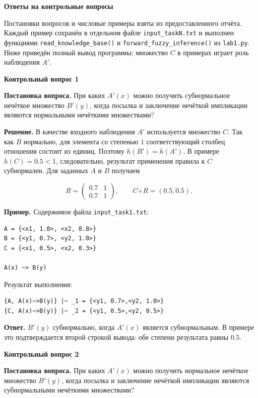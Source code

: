 \documentclass[14pt,a4paper]{extarticle}
\newcommand{\reportheading}[1]{\par\vspace{0.8\baselineskip}\noindent\textbf{#1}\par\nobreak\vspace{0.35\baselineskip}\nobreak}
\begin{document}
\clearpage
\reportheading{Ответы на контрольные вопросы}

Постановки вопросов и числовые примеры взяты из предоставленного отчёта. Каждый пример сохранён в отдельном файле \texttt{input\_taskN.txt} и выполнен функциями \texttt{read\_knowledge\_base()} и \texttt{forward\_fuzzy\_inference()} из \texttt{lab1.py}. Ниже приведён полный вывод программы; множество $C$ в примерах играет роль наблюдения $A'$.

\reportheading{Контрольный вопрос 1}

\noindent\textbf{Постановка вопроса.} При каких $A'(x)$ можно получить субнормальное нечёткое множество $B'(y)$, когда посылка и заключение нечёткой импликации являются нормальными нечёткими множествами?

\smallskip\noindent\textbf{Решение.} В качестве входного наблюдения $A'$ используется множество $C$. Так как $B$ нормально, для элемента со степенью $1$ соответствующий столбец отношения состоит из единиц. Поэтому $h(B')=h(A')$. В примере $h(C)=0.5<1$, следовательно, результат применения правила к $C$ субнормален. Для заданных $A$ и $B$ получаем

\[
R=\begin{pmatrix}0.7&1\\0.7&1\end{pmatrix},\qquad C\circ R=(0.5,0.5).
\]

\noindent\textbf{Пример.} Содержимое файла \texttt{input\_task1.txt}:

\begin{Verbatim}[fontsize=\small,baselinestretch=1,frame=single,breaklines=true]
A = {<x1, 1.0>, <x2, 0.8>}
B = {<y1, 0.7>, <y2, 1.0>}
C = {<x1, 0.5>, <x2, 0.3>}

A(x) ~> B(y)
\end{Verbatim}

\noindent Результат выполнения:

\begin{Verbatim}[fontsize=\small,baselinestretch=1,frame=single,breaklines=true]
{A, A(x)~>B(y)} |~ _1 = {<y1, 0.7>,<y2, 1.0>}
{C, A(x)~>B(y)} |~ _2 = {<y1, 0.5>,<y2, 0.5>}
\end{Verbatim}

\smallskip\noindent\textbf{Ответ.} $B'(y)$ субнормально, когда $A'(x)$ является субнормальным. В примере это подтверждается второй строкой вывода: обе степени результата равны $0.5$.


\clearpage
\reportheading{Контрольный вопрос 2}

\noindent\textbf{Постановка вопроса.} При каких $A'(x)$ можно получить нормальное нечёткое множество $B'(y)$, когда посылка и заключение нечёткой импликации являются субнормальными нечёткими множествами?
\end{document}
